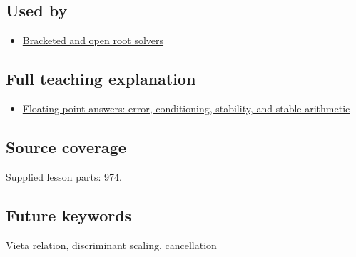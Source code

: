\subsection{Used by}\label{appendix-b9afba7f63e5-used-by}

\begin{itemize}
\tightlist
\item
  \hyperref[appendix-f63eb850796d]{Bracketed and open root solvers}
\end{itemize}

\subsection{Full teaching explanation}\label{appendix-b9afba7f63e5-full-teaching-explanation}

\begin{itemize}
\tightlist
\item
  \hyperref[02-foundations-ii-ch028-floating-point-answers-error-conditioning-stability-and-stable-arithmetic]{Floating-point answers: error, conditioning, stability, and stable arithmetic}
\end{itemize}

\subsection{Source coverage}\label{appendix-b9afba7f63e5-source-coverage}

Supplied lesson parts: 974.

\subsection{Future keywords}\label{appendix-b9afba7f63e5-future-keywords}

Vieta relation, discriminant scaling, cancellation

